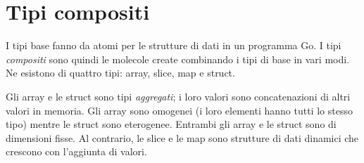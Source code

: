 \documentclass[../thesis.tex]{subfiles}
\begin{document}
    \newpage


    \section{Tipi compositi}\label{sec:tipi-compositi}
    I tipi base fanno da atomi per le strutture di dati in un programma Go. I tipi \textit{compositi} sono quindi le molecole create combinando i tipi di base in vari modi.
    Ne esistono di quattro tipi: array, slice, map e struct.
    \hfill \vspace{12pt}

    Gli array e le struct sono tipi \textit{aggregati}; i loro valori sono concatenazioni di altri valori in memoria.
    Gli array sono omogenei (i loro elementi hanno tutti lo stesso tipo) mentre le struct sono eterogenee.
    Entrambi gli array e le struct sono di dimensioni fisse.
    Al contrario, le slice e le map sono strutture di dati dinamici che crescono con l'aggiunta di valori.
    
    
    
    
    \clearpage
\end{document}
